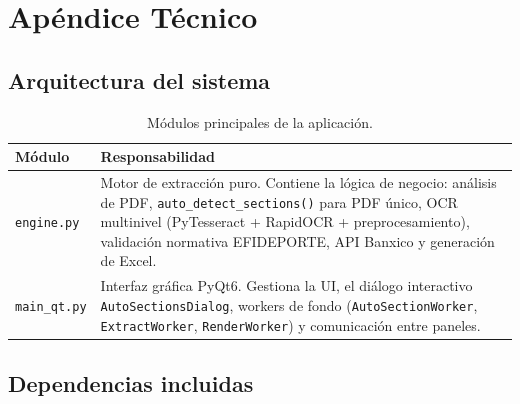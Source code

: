 \documentclass[12pt, a4paper, oneside]{report}
\begin{document}
\chapter{Apéndice Técnico}

\section{Arquitectura del sistema}

\begin{table}[H]
  \centering
  \begin{tabularx}{\linewidth}{lX}
    \toprule
    \textbf{Módulo} & \textbf{Responsabilidad} \\
    \midrule
    \texttt{engine.py}   & Motor de extracción puro. Contiene la lógica de negocio:
                           análisis de PDF, \texttt{auto\_detect\_sections()} para PDF único,
                           OCR multinivel (PyTesseract + RapidOCR + preprocesamiento),
                           validación normativa EFIDEPORTE, API Banxico y generación de Excel. \\
    \texttt{main\_qt.py} & Interfaz gráfica PyQt6. Gestiona la UI, el diálogo interactivo
                           \texttt{AutoSectionsDialog}, workers de fondo (\texttt{AutoSectionWorker},
                           \texttt{ExtractWorker}, \texttt{RenderWorker}) y comunicación entre paneles. \\
    \bottomrule
  \end{tabularx}
  \caption{Módulos principales de la aplicación.}
\end{table}

\section{Dependencias incluidas}
\end{document}
